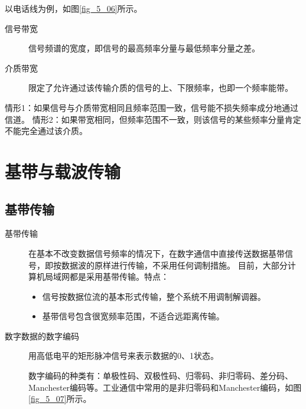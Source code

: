 \begin{remark}
以电话线为例，如图\ref{fig_5_06}所示。
\begin{description}
  \item[信号带宽] 信号频谱的宽度，即信号的最高频率分量与最低频率分量之差。
  \item[介质带宽] 限定了允许通过该传输介质的信号的上、下限频率，也即一个频率能带。
\end{description}

情形1：如果信号与介质带宽相同且频率范围一致，信号能不损失频率成分地通过信道。
情形2：如果带宽相同，但频率范围不一致，则该信号的某些频率分量肯定不能完全通过该介质。

\end{remark}

\section{基带与载波传输}

\subsection{基带传输}

\begin{description}
  \item[基带传输] 在基本不改变数据信号频率的情况下，在数字通信中直接传送数据基带信号，即按数据波的原样进行传输，不采用任何调制措施。
目前，大部分计算机局域网都是采用基带传输。特点：
\begin{itemize}
  \item 信号按数据位流的基本形式传输，整个系统不用调制解调器。
  \item 基带信号包含很宽频率范围，不适合远距离传输。
\end{itemize}

  \item[数字数据的数字编码] 用高低电平的矩形脉冲信号来表示数据的0、1状态。

  数字编码的种类有：单极性码、双极性码、归零码、非归零码、差分码、Manchester编码等。工业通信中常用的是非归零码和Manchester编码，如图\ref{fig_5_07}所示。

\end{description}

